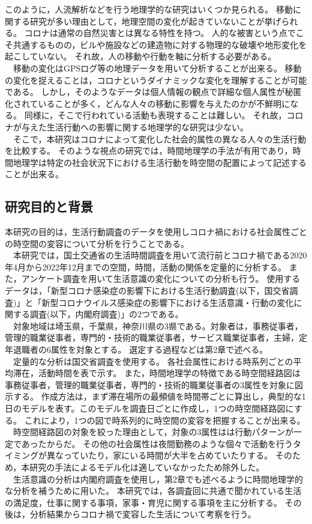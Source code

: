 \documentclass[paper={210mm,297mm},line_length=35zw,number_of_lines=31,head_space=30mm,gutter=40mm,baselineskip=2.0zw,headfoot_verticalposition=1.5zw]{jlreq} %
\begin{document}
このように，人流解析などを行う地理学的な研究はいくつか見られる。
移動に関する研究が多い理由として，地理空間の変化が起きていないことが挙げられる。
コロナは通常の自然災害とは異なる特性を持つ。
人的な被害という点でこそ共通するものの，ビルや施設などの建造物に対する物理的な破壊や地形変化を起こしていない。
それ故，人の移動や行動を軸に分析する必要がある。\\
　移動の変化はGPSログ等の地理データを用いて分析することが出来る。
移動の変化を捉えることは，コロナというダイナミックな変化を理解することが可能である。
しかし，そのようなデータは個人情報の観点で詳細な個人属性が秘匿化されていることが多く，どんな人々の移動に影響を与えたのかが不鮮明になる。
同様に，そこで行われている活動も表現することは難しい。
それ故，コロナが与えた生活行動への影響に関する地理学的な研究は少ない。\\
　そこで，本研究はコロナによって変化した社会的属性の異なる人々の生活行動を比較する。
そのような視点の研究では，時間地理学の手法が有用であり，時間地理学は特定の社会状況下における生活行動を時空間の配置によって記述することが出来る。\\

\subsection{研究目的と背景}

本研究の目的は，生活行動調査のデータを使用しコロナ禍における社会属性ごとの時空間の変容について分析を行うことである。\\
　本研究では，国土交通省の生活時間調査を用いて流行前とコロナ禍である2020年4月から2022年12月までの空間，時間，活動の関係を定量的に分析する。
また，アンケート調査を用いて生活意識の変化についての分析も行う。
使用するデータは，「新型コロナ感染症の影響下における生活行動調査(以下，国交省調査)」と「新型コロナウイルス感染症の影響下における生活意識・行動の変化に関する調査(以下，内閣府調査)」の2つである。\\
　対象地域は埼玉県，千葉県，神奈川県の3県である。対象者は，事務従事者，管理的職業従事者，専門的・技術的職業従事者，サービス職業従事者，主婦，定年退職者の6属性を対象とする。
選定する過程などは第2章で述べる。\\
　定量的な分析は国交省調査を使用する。
各社会属性における時系列ごとの平均滞在，活動時間を表で示す。
また，時間地理学の特徴である時空間経路図は事務従事者，管理的職業従事者，専門的・技術的職業従事者の3属性を対象に図示する。
作成方法は，まず滞在場所の最頻値を時間帯ごとに算出し，典型的な1日のモデルを表す。このモデルを調査日ごとに作成し，1つの時空間経路図にする。
これにより，1つの図で時系列的に時空間の変容を把握することが出来る。\\
　時空間経路図の対象を絞った理由として，対象の3属性はは行動パターンが一定であったからだ。
その他の社会属性は夜間勤務のような個々で活動を行うタイミングが異なっていたり，家にいる時間が大半を占めていたりする。
そのため，本研究の手法によるモデル化は適していなかったため除外した。\\
　生活意識の分析は内閣府調査を使用し，第2章でも述べるように時間地理学的な分析を補うために用いた。
本研究では，各調査回に共通で聞かれている生活の満足度，仕事に関する事項，家事・育児に関する事項を主に分析する。
その後は，分析結果からコロナ禍で変容した生活について考察を行う。\\
\end{document}
